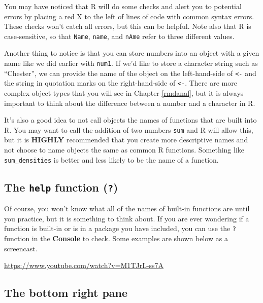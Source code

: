 \documentclass[]{tufte-book}
\begin{document}
You may have noticed that R will do some checks and alert you to potential errors by placing a red X to the left of lines of code with common syntax errors. These checks won't catch all errors, but this can be helpful. Note also that R is case-sensitive, so that \texttt{Name}, \texttt{name}, and \texttt{nAme} refer to three different values.

Another thing to notice is that you can store numbers into an object with a given name like we did earlier with \texttt{num1}. If we'd like to store a character string such as ``Chester'', we can provide the name of the object on the left-hand-side of \texttt{\textless{}-} and the string in quotation marks on the right-hand-side of \texttt{\textless{}-}. There are more complex object types that you will see in Chapter \ref{rmdanal}, but it is always important to think about the difference between a number and a character in R.

It's also a good idea to not call objects the names of functions that are built into R. You may want to call the addition of two numbers \texttt{sum} and R will allow this, but it is \textbf{HIGHLY} recommended that you create more descriptive names and not choose to name objects the same as common R functions. Something like \texttt{sum\_densities} is better and less likely to be the name of a function.

\subsection{\texorpdfstring{The \texttt{help} function (\texttt{?})}{The help function (?)}}\label{the-help-function}

Of course, you won't know what all of the names of built-in functions are until you practice, but it is something to think about. If you are ever wondering if a function is built-in or is in a package you have included, you can use the \texttt{?} function in the \textbf{Console} to check. Some examples are shown below as a screencast.

\vspace{0.1in}\begin{center}\footnotesize{\url{https://www.youtube.com/watch?v=M1TJrL-ss7A}}\end{center}\vspace{0.1in}

\subsection{The bottom right pane}\label{the-bottom-right-pane}
\end{document}
